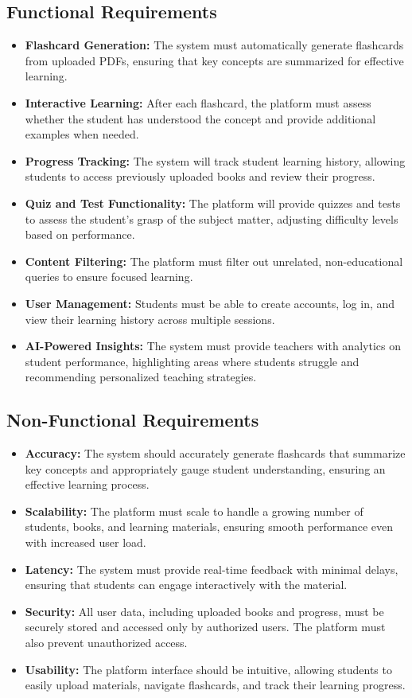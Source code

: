 \documentclass{report}
\begin{document}
\subsection{Functional Requirements}
\begin{itemize}
    \item \textbf{Flashcard Generation:} The system must automatically generate flashcards from uploaded PDFs, ensuring that key concepts are summarized for effective learning.
    \item \textbf{Interactive Learning:} After each flashcard, the platform must assess whether the student has understood the concept and provide additional examples when needed.
    \item \textbf{Progress Tracking:} The system will track student learning history, allowing students to access previously uploaded books and review their progress.
    \item \textbf{Quiz and Test Functionality:} The platform will provide quizzes and tests to assess the student’s grasp of the subject matter, adjusting difficulty levels based on performance.
    \item \textbf{Content Filtering:} The platform must filter out unrelated, non-educational queries to ensure focused learning.
    \item \textbf{User Management:} Students must be able to create accounts, log in, and view their learning history across multiple sessions.
    \item \textbf{AI-Powered Insights:} The system must provide teachers with analytics on student performance, highlighting areas where students struggle and recommending personalized teaching strategies.
\end{itemize}

\subsection{Non-Functional Requirements}
\begin{itemize}
    \item \textbf{Accuracy:} The system should accurately generate flashcards that summarize key concepts and appropriately gauge student understanding, ensuring an effective learning process.
    \item \textbf{Scalability:} The platform must scale to handle a growing number of students, books, and learning materials, ensuring smooth performance even with increased user load.
    \item \textbf{Latency:} The system must provide real-time feedback with minimal delays, ensuring that students can engage interactively with the material.
    \item \textbf{Security:} All user data, including uploaded books and progress, must be securely stored and accessed only by authorized users. The platform must also prevent unauthorized access.
    \item \textbf{Usability:} The platform interface should be intuitive, allowing students to easily upload materials, navigate flashcards, and track their learning progress.
\end{itemize}
\end{document}
